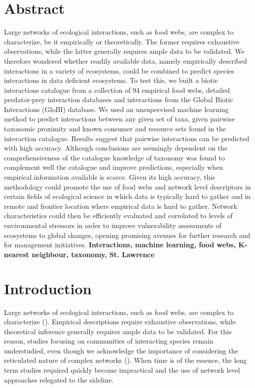 \section{Abstract}
Large networks of ecological interactions, such as food webs, are complex to characterize, be it empirically or theoretically. The former requires exhaustive observations, while the latter generally requires ample data to be validated. We therefore wondered whether readily available data, namely empirically described interactions in a variety of ecosystems, could be combined to predict species interactions in data deficient ecosystems. To test this, we built a biotic interactions catalogue from a collection of 94 empirical food webs, detailed predator-prey interaction databases and interactions from the Global Biotic Interactions (GloBI) database. We used an unsupervised machine learning method to predict interactions between any given set of taxa, given pairwise taxonomic proximity and known consumer and resource sets found in the interaction catalogue. Results suggest that pairwise interactions can be predicted with high accuracy. Although conclusions are seemingly dependent on the comprehensiveness of the catalogue knowledge of taxonomy was found to complement well the catalogue and improve predictions, especially when empirical information available is scarce. Given its high accuracy, this methodology could promote the use of food webs and network level descriptors in certain fields of ecological science in which data is typically hard to gather and in remote and frontier location where empirical data is hard to gather. Network characteristics could then be efficiently evaluated and correlated to levels of environmental stressors in order to improve vulnerability assessments of ecosystems to global changes, opening promising avenues for further research and for management initiatives.
\newline
\textbf{Interactions, machine learning, food webs, K-nearest neighbour, taxonomy, St. Lawrence}

\section{Introduction}
Large networks of ecological interactions, such as food webs, are complex to characterize (\cite{polis1991, martinez1992, pascual2006}). Empirical descriptions require exhaustive observations, while theoretical inference generally requires ample data to be validated. For this reason, studies focusing on communities of interacting species remain understudied, even though we acknowledge the importance of considering the reticulated nature of complex networks (\cite{ings2009, tylianakis2008}). When time is of the essence, the long term studies required quickly become impractical and the use of network level approaches relegated to the sideline.

